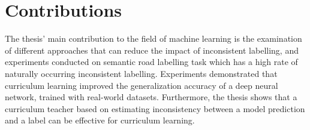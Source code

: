 \section{Contributions}
\label{sec:IntroContributions}
The thesis' main contribution to the field of machine learning  is the examination of different approaches that can reduce the impact of inconsistent labelling, and experiments conducted on semantic road labelling task which has a high rate of naturally occurring inconsistent labelling. Experiments demonstrated that curriculum learning improved the generalization accuracy of a deep neural network, trained with real-world datasets. Furthermore, the thesis shows that a curriculum teacher based on estimating inconsistency between a model prediction and a label can be effective for curriculum learning.